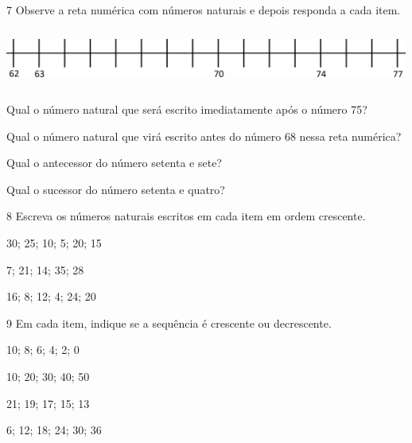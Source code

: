 \num{7} Observe a reta numérica com números naturais e depois responda a cada item.


\includegraphics[width=5.22545in,height=0.75840in]{media/image31.png}

\begin{escolha}
\item Qual o número natural que será escrito imediatamente após o número 75?


\item Qual o número natural que virá escrito antes do número 68 nessa reta numérica?


\item Qual o antecessor do número setenta e sete?

\reduline{76\hfill}

\item Qual o sucessor do número setenta e quatro?

\reduline{75\hfill}
\end{escolha}

\num{8} Escreva os números naturais escritos em cada item em ordem crescente.

\begin{escolha}
\item 30; 25; 10; 5; 20; 15


\item 7; 21; 14; 35; 28


\item 16; 8; 12; 4; 24; 20

\end{escolha}

\num{9} Em cada item, indique se a sequência é crescente ou decrescente.

\begin{escolha}
\item 10; 8; 6; 4; 2; 0


\item 10; 20; 30; 40; 50


\item 21; 19; 17; 15; 13


\item 6; 12; 18; 24; 30; 36

\end{escolha}

